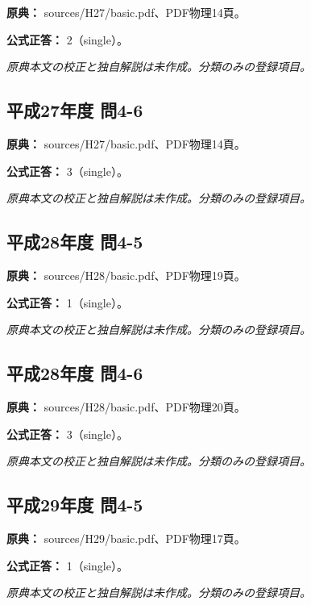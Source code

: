 \noindent\textbf{原典：} sources/H27/basic.pdf、PDF物理14頁。

\textbf{公式正答：} 2（single）。

\par\textit{原典本文の校正と独自解説は未作成。分類のみの登録項目。}

\subsection{平成27年度 問4-6}
\label{q:h27-reg-basic-4-6}

\noindent\textbf{原典：} sources/H27/basic.pdf、PDF物理14頁。

\textbf{公式正答：} 3（single）。

\par\textit{原典本文の校正と独自解説は未作成。分類のみの登録項目。}

\subsection{平成28年度 問4-5}
\label{q:h28-reg-basic-4-5}

\noindent\textbf{原典：} sources/H28/basic.pdf、PDF物理19頁。

\textbf{公式正答：} 1（single）。

\par\textit{原典本文の校正と独自解説は未作成。分類のみの登録項目。}

\subsection{平成28年度 問4-6}
\label{q:h28-reg-basic-4-6}

\noindent\textbf{原典：} sources/H28/basic.pdf、PDF物理20頁。

\textbf{公式正答：} 3（single）。

\par\textit{原典本文の校正と独自解説は未作成。分類のみの登録項目。}

\subsection{平成29年度 問4-5}
\label{q:h29-reg-basic-4-5}

\noindent\textbf{原典：} sources/H29/basic.pdf、PDF物理17頁。

\textbf{公式正答：} 1（single）。

\par\textit{原典本文の校正と独自解説は未作成。分類のみの登録項目。}

